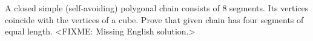 \problem
A closed simple (self-avoiding) polygonal chain consists of 8 segments.
Its vertices coincide with the vertices of a cube.
Prove that given chain has four segments of equal length.
\solution
<FIXME: Missing English solution.>
\endproblem
